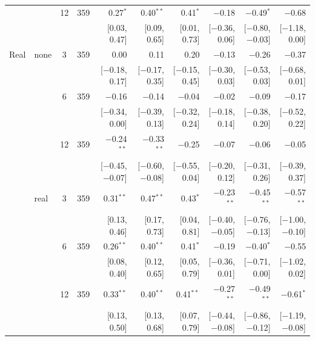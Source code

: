 \begin{longtable}{llcrrrrrrr}
 &  & 12 & 359 & 0.27$^{*}$ & 0.40$^{**}$ & 0.41$^{*}$ & $-$0.18 & $-$0.49$^{*}$ & $-$0.68\\
 & & & & {\scriptsize [0.03, 0.47]} & {\scriptsize [0.09, 0.65]} & {\scriptsize [0.01, 0.73]} & {\scriptsize [$-$0.36, 0.06]} & {\scriptsize [$-$0.80, $-$0.03]} & {\scriptsize [$-$1.18, 0.00]}\\
\addlinespace
Real & none & 3 & 359 & 0.00 & 0.11 & 0.20 & $-$0.13 & $-$0.26 & $-$0.37\\
 & & & & {\scriptsize [$-$0.18, 0.17]} & {\scriptsize [$-$0.17, 0.35]} & {\scriptsize [$-$0.15, 0.45]} & {\scriptsize [$-$0.30, 0.03]} & {\scriptsize [$-$0.53, 0.03]} & {\scriptsize [$-$0.68, 0.01]}\\
 &  & 6 & 359 & $-$0.16 & $-$0.14 & $-$0.04 & $-$0.02 & $-$0.09 & $-$0.17\\
 & & & & {\scriptsize [$-$0.34, 0.00]} & {\scriptsize [$-$0.39, 0.13]} & {\scriptsize [$-$0.32, 0.24]} & {\scriptsize [$-$0.18, 0.14]} & {\scriptsize [$-$0.38, 0.20]} & {\scriptsize [$-$0.52, 0.22]}\\
 &  & 12 & 359 & $-$0.24$^{**}$ & $-$0.33$^{**}$ & $-$0.25 & $-$0.07 & $-$0.06 & $-$0.05\\
 & & & & {\scriptsize [$-$0.45, $-$0.07]} & {\scriptsize [$-$0.60, $-$0.08]} & {\scriptsize [$-$0.55, 0.04]} & {\scriptsize [$-$0.20, 0.12]} & {\scriptsize [$-$0.31, 0.26]} & {\scriptsize [$-$0.39, 0.37]}\\
 & real & 3 & 359 & 0.31$^{**}$ & 0.47$^{**}$ & 0.43$^{*}$ & $-$0.23$^{**}$ & $-$0.45$^{**}$ & $-$0.57$^{**}$\\
 & & & & {\scriptsize [0.13, 0.46]} & {\scriptsize [0.17, 0.73]} & {\scriptsize [0.04, 0.81]} & {\scriptsize [$-$0.40, $-$0.05]} & {\scriptsize [$-$0.76, $-$0.13]} & {\scriptsize [$-$1.00, $-$0.10]}\\
 &  & 6 & 359 & 0.26$^{**}$ & 0.40$^{**}$ & 0.41$^{*}$ & $-$0.19 & $-$0.40$^{*}$ & $-$0.55\\
 & & & & {\scriptsize [0.08, 0.40]} & {\scriptsize [0.12, 0.65]} & {\scriptsize [0.05, 0.79]} & {\scriptsize [$-$0.36, 0.01]} & {\scriptsize [$-$0.71, 0.00]} & {\scriptsize [$-$1.02, 0.02]}\\
 &  & 12 & 359 & 0.33$^{**}$ & 0.40$^{**}$ & 0.41$^{**}$ & $-$0.27$^{**}$ & $-$0.49$^{**}$ & $-$0.61$^{*}$\\
 & & & & {\scriptsize [0.13, 0.50]} & {\scriptsize [0.13, 0.68]} & {\scriptsize [0.07, 0.79]} & {\scriptsize [$-$0.44, $-$0.08]} & {\scriptsize [$-$0.86, $-$0.12]} & {\scriptsize [$-$1.19, $-$0.08]}\\

\end{longtable}
